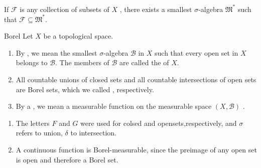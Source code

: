 \documentclass[../main.tex]{subfiles}
\begin{document}
\begin{theorem}{}{}
    If \(  \mathscr{F}  \) is any collection of  subsets of \(  X  \) , there exists a smallest \(   \sigma   \)-algebra \(  \mathfrak{M}^{*}  \) such that \(  \mathscr{F}\subseteq  \mathfrak{M}^{*}  \).     
\end{theorem}

\begin{definition}{Borel}{}
    Let \(  X  \) be a topological space. 
    \begin{enumerate}
        \item By  , we mean the smallest \(   \sigma   \)-algebra \(  \mathscr{B}  \) in \(  X  \) such that every open set in \(  X  \) belongs to \(  \mathscr{B}  \).   The members of \(  \mathscr{B}  \) are called the  of \(  X  \).  
        \item All countable unions of closed sets and all countable intersections of open sets are Borel sets, which we called , respectively. 
        \item By a , we mean a measurable function on the measurable space \(  \left( X,\mathscr{B} \right)   \) .
    \end{enumerate}
         
\end{definition}
\begin{remark}
   \begin{enumerate}
    \item  The letters \(  F  \) and \(  G  \) were used for colsed and opensets,respectively, and \(   \sigma   \) refers to union, \(   \delta   \) to intersection. 
    \item A continuous function is Borel-measurable, since the preimage of any open set is open and therefore a Borel set.
   \end{enumerate}
      
\end{remark}
\end{document}
